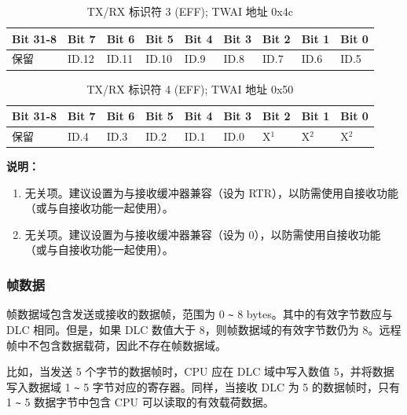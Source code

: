 \documentclass[main\_\_CN.tex]{subfiles}
\begin{document}
\begin{longtable}[c]{|p{1.4cm}|p{1.4cm}|p{1.4cm}|p{1.4cm}|p{1.4cm}|p{1.4cm}|p{1.4cm}|p{1.4cm}|p{1.4cm}|}
    \caption{TX/RX 标识符 3 (EFF); TWAI 地址 0x4c}
    \label{tab:twai-tx-rx-identifier-3-eff}\\
    \hline
       \rowcolor{lightgray}
    \textbf{Bit 31-8} & \textbf{Bit 7} & \textbf{Bit 6} & \textbf{Bit 5} & \textbf{Bit 4} & \textbf{Bit 3} & \textbf{Bit 2} & \textbf{Bit 1} & \textbf{Bit 0}\\\hline
    保留 & ID.12 & ID.11 & ID.10 & ID.9 & ID.8 & ID.7 & ID.6 & ID.5\\
    \hline
\end{longtable}

\begin{longtable}[c]{|p{1.4cm}|p{1.4cm}|p{1.4cm}|p{1.4cm}|p{1.4cm}|p{1.4cm}|p{1.4cm}|p{1.4cm}|p{1.4cm}|}
    \caption{TX/RX 标识符 4 (EFF); TWAI 地址 0x50}
    \label{tab:twai-tx-rx-identifier-4-eff}\\
    \hline
       \rowcolor{lightgray}
    \textbf{Bit 31-8} & \textbf{Bit 7} & \textbf{Bit 6} & \textbf{Bit 5} & \textbf{Bit 4} & \textbf{Bit 3} & \textbf{Bit 2} & \textbf{Bit 1} & \textbf{Bit 0}\\\hline
    保留 & ID.4 & ID.3 & ID.2 & ID.1 & ID.0 & X$^1$ & X$^2$ & X$^2$\\
    \hline
\end{longtable}
\vspace{-1.5em}
{\bfseries 说明：}\\
\begin{enumerate}
    \item 无关项。建议设置为与接收缓冲器兼容（设为 RTR），以防需使用自接收功能（或与自接收功能一起使用）。
    \item 无关项。建议设置为与接收缓冲器兼容（设为 0），以防需使用自接收功能（或与自接收功能一起使用）。
\end{enumerate}

\subsubsection{帧数据}
帧数据域包含发送或接收的数据帧，范围为 0 \verb+~+ 8 bytes。其中的有效字节数应与 DLC 相同。但是，如果 DLC 数值大于 8，则帧数据域的有效字节数仍为 8。远程帧中不包含数据载荷，因此不存在帧数据域。

比如，当发送 5 个字节的数据帧时，CPU 应在 DLC 域中写入数值 5，并将数据写入数据域 1 \verb+~+ 5 字节对应的寄存器。同样，当接收 DLC 为 5 的数据帧时，只有 1 \verb+~+ 5 数据字节中包含 CPU 可以读取的有效载荷数据。
\end{document}
